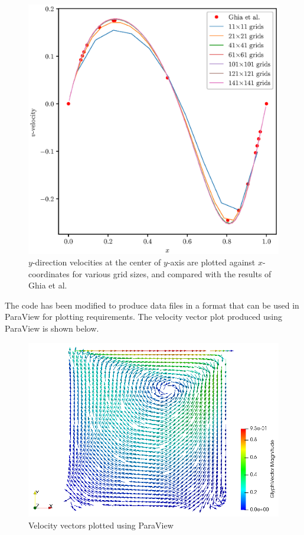 \documentclass[12pt,a4paper,fleqn]{article}
\begin{document}
\begin{figure}[H]
    \centering
    \includegraphics[width=\linewidth]{final18051412_cavityFlowV.eps}
        \caption{\(y\)-direction velocities at the center of \(y\)-axis are plotted against \(x\)-coordinates for various grid sizes, and compared with the results of Ghia et al.}
\end{figure}

The code has been modified to produce data files in a format that can be used in ParaView for plotting requirements. The velocity vector plot produced using ParaView is shown below.

\begin{figure}[H]
    \centering
    \includegraphics[width=\linewidth]{velVectors.png}
    \caption{Velocity vectors plotted using ParaView}
\end{figure}
\end{document}
